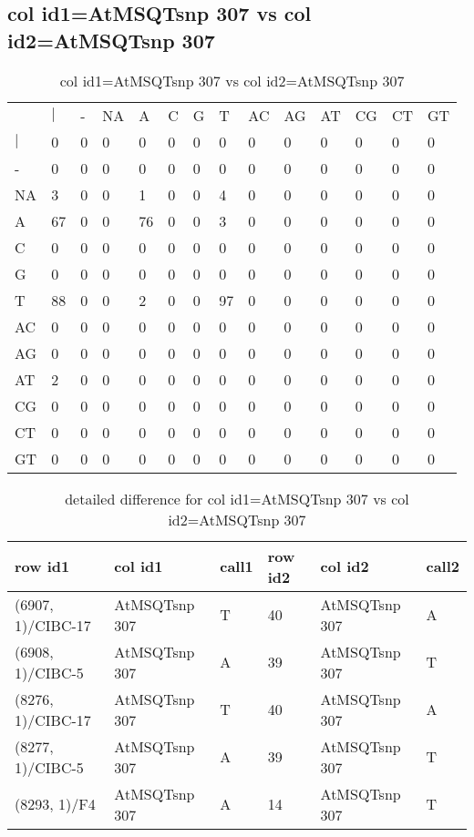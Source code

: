 \subsection{col id1=AtMSQTsnp 307 vs col id2=AtMSQTsnp 307}
\begin{center}
\begin{longtable}{|l|l|l|l|l|l|l|l|l|l|l|l|l|l|}
\caption{col id1=AtMSQTsnp 307 vs col id2=AtMSQTsnp 307} \label{table_dm846}\\
\hline
\\
\hline
&$|$&-&NA&A&C&G&T&AC&AG&AT&CG&CT&GT\\
$|$&0&0&0&0&0&0&0&0&0&0&0&0&0\\
-&0&0&0&0&0&0&0&0&0&0&0&0&0\\
NA&3&0&0&1&0&0&4&0&0&0&0&0&0\\
A&67&0&0&76&0&0&3&0&0&0&0&0&0\\
C&0&0&0&0&0&0&0&0&0&0&0&0&0\\
G&0&0&0&0&0&0&0&0&0&0&0&0&0\\
T&88&0&0&2&0&0&97&0&0&0&0&0&0\\
AC&0&0&0&0&0&0&0&0&0&0&0&0&0\\
AG&0&0&0&0&0&0&0&0&0&0&0&0&0\\
AT&2&0&0&0&0&0&0&0&0&0&0&0&0\\
CG&0&0&0&0&0&0&0&0&0&0&0&0&0\\
CT&0&0&0&0&0&0&0&0&0&0&0&0&0\\
GT&0&0&0&0&0&0&0&0&0&0&0&0&0\\
\hline
\end{longtable}
\end{center}

\begin{center}
\begin{longtable}{|l|l|l|l|l|l|}
\caption{detailed difference for col id1=AtMSQTsnp 307 vs col id2=AtMSQTsnp 307} \label{table_dm847}\\
\hline
row id1&col id1&call1&row id2&col id2&call2\\
\hline
(6907, 1)/CIBC-17&AtMSQTsnp 307&T&40&AtMSQTsnp 307&A\\
(6908, 1)/CIBC-5&AtMSQTsnp 307&A&39&AtMSQTsnp 307&T\\
(8276, 1)/CIBC-17&AtMSQTsnp 307&T&40&AtMSQTsnp 307&A\\
(8277, 1)/CIBC-5&AtMSQTsnp 307&A&39&AtMSQTsnp 307&T\\
(8293, 1)/F4&AtMSQTsnp 307&A&14&AtMSQTsnp 307&T\\
\hline
\end{longtable}
\end{center}

